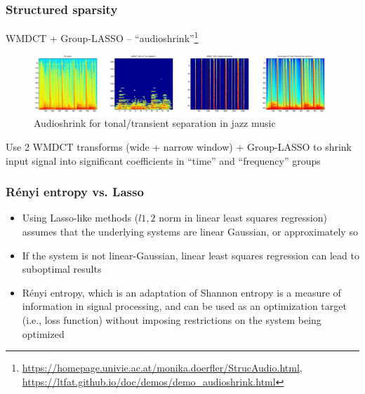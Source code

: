 \documentclass{beamer}
\begin{document}
\begin{frame}
	\frametitle{Structured sparsity}
	WMDCT + Group-LASSO -- ``audioshrink''\footnote{\url{https://homepage.univie.ac.at/monika.doerfler/StrucAudio.html}, \url{https://ltfat.github.io/doc/demos/demo_audioshrink.html}}
	\begin{figure}[ht]
		\vspace{-0.5em}
		\includegraphics[width=11cm]{./wmdctjazz.png}
		\caption{Audioshrink for tonal/transient separation in jazz music}
		\vspace{-0.5em}
	\end{figure}
	Use 2 WMDCT transforms (wide + narrow window) + Group-LASSO to shrink input signal into significant coefficients in ``time'' and ``frequency'' groups
\end{frame}

\begin{frame}
	\frametitle{R{\'e}nyi entropy vs. Lasso}
	\begin{itemize}
	\item
		Using Lasso-like methods ($l1,2$ norm in linear least squares regression) assumes that the underlying systems are linear Gaussian, or approximately so
	\item
		If the system is not linear-Gaussian, linear least squares regression can lead to suboptimal results
	\item
		R{\'e}nyi entropy, which is an adaptation of Shannon entropy  is a measure of information in signal processing, and can be used as an optimization target (i.e., loss function) without imposing restrictions on the system being optimized
	\end{itemize}
\end{frame}
\end{document}
